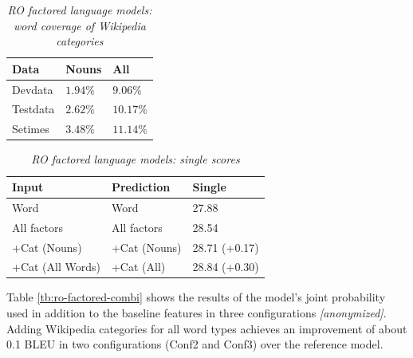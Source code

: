 \documentclass[a4paper]{article}
\newcommand{\anony}[1]{\textit{[anonymized]}}
\begin{document}
\begin{table}
\caption{\it RO factored language models: word coverage of Wikipedia categories}
\vspace{2mm}
\centering
  \begin{tabular}{lll}
  	\hline
  	Data     & Nouns     & All        \\ \hline\hline
  	Devdata  & $1.94 \%$ & $9.06 \%$  \\
  	Testdata & $2.62 \%$ & $10.17 \%$ \\ \hline
  	Setimes  & $3.48 \%$ & $11.14 \%$
  \end{tabular}
  \label{tb:ro-word-coverage}
\end{table}

\begin{table}
\caption{\it RO factored language models: single scores}
\vspace{2mm}
\centering
  \begin{tabular}{lll}
  	\hline
  	Input            & Prediction   & Single        \\ \hline\hline
  	Word             & Word         & 27.88         \\
  	All factors      & All factors  & 28.54         \\ \hline
  	+Cat (Nouns)     & +Cat (Nouns) & 28.71 (+0.17) \\
  	+Cat (All Words) & +Cat (All)   & 28.84 (+0.30)
  \end{tabular}
  \label{tb:ro-factored-single}
\end{table}

Table \ref{tb:ro-factored-combi} shows the results of the model's joint probability used in addition to the baseline features in three configurations \anony{\cite{niehuesusing}}. 
Adding Wikipedia categories for all word types achieves an improvement of about 0.1 BLEU in two configurations (Conf2 and Conf3) over the reference model.
\end{document}
